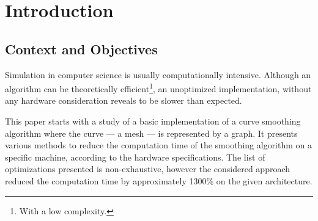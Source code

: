 \documentclass[fleqn,11pt]{SelfArx} %
\affiliation{\textsuperscript{1}RB812 \hfill \textsuperscript{2}AC5612 \hfill \textsuperscript{3}GF210}
\theoremstyle{definition}
\begin{document}



\flushbottom %

\maketitle %

\tableofcontents %

\thispagestyle{empty} %


\section{Introduction}
\subsection{Context and Objectives}

Simulation in computer science is usually computationally intensive. Although an algorithm can be theoretically efficient\footnote{With a low complexity.}, an unoptimized implementation, without any hardware consideration reveals to be slower than expected.

This paper starts with a study of a basic implementation of a curve smoothing algorithm where the curve --- a mesh --- is represented by a graph. It presents various methods to reduce the computation time of the smoothing algorithm on a specific machine, according to the hardware specifications. The list of optimizations presented is non-exhaustive, however the considered approach reduced the computation time by approximately 1300\% on the given architecture.
\end{document}
